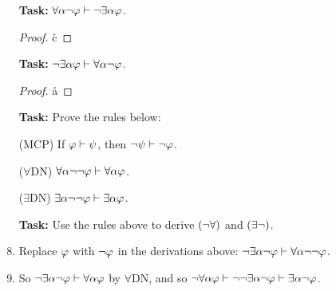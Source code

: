 \documentclass[a4paper, 11pt]{article} %
\begin{document}
\begin{enumerate}
  \item[\bf Task:] $\forall \alpha\neg\varphi \vdash \neg\exists \alpha\varphi$.
    \begin{proof}
            \pr{}
        \open
                  
            \open
                
                \open
                    
                    \r{c}
                    
                \close
                
            \close
            
        \close
             
    \end{proof}
  \item[\bf Task:] $\neg\exists \alpha\varphi \vdash \forall \alpha\neg\varphi$.
    \begin{proof}
            \pr{}
        \open
                
                 
            \r{a}
        \close
           
             
    \end{proof}
  \item[\bf Task:] Prove the rules below: 
  \item[(MCP)] If $\varphi\vdash\psi$, then $\neg\psi\vdash\neg\varphi$.
  \item[($\forall$DN)] $\forall\alpha\neg\neg\varphi\vdash\forall\alpha\varphi$.
  \item[($\exists$DN)] $\exists\alpha\neg\neg\varphi\vdash\exists\alpha\varphi$.
  \item[\bf Task:] Use the rules above to derive $(\neg\forall)$ and $(\exists\neg)$.
    \item Replace $\varphi$ with $\neg \varphi$ in the derivations above: $\neg \exists \alpha \neg \varphi \vdash \forall \alpha\neg \neg \varphi$. 
    \item So $\neg \exists \alpha \neg \varphi \vdash \forall \alpha\varphi$ by $\forall$DN, and so $\neg \forall \alpha\varphi \vdash \neg \neg \exists \alpha \neg \varphi \vdash \exists \alpha \neg \varphi$. 
\end{enumerate}


\end{document}

